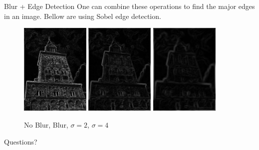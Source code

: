 \documentclass{beamer}
\begin{document}
\begin{frame}{Blur + Edge Detection}
One can combine these operations to find the major edges in an image. Bellow are using Sobel edge detection.

\begin{figure}[ht]
\includegraphics[width=1.3in]{churchout.jpg}
\hspace{.1in} 
\includegraphics[width=1.3in]{churchoutbluredge.jpg}
\hspace{.1in}
\includegraphics[width=1.3in]{churchoutblur2edge.jpg}
\hspace{.1in}
\caption{No Blur, Blur, $\sigma = 2$, $\sigma = 4$}
\end{figure}
\end{frame}

\begin{frame}
Questions?
\end{frame}
\end{document}

